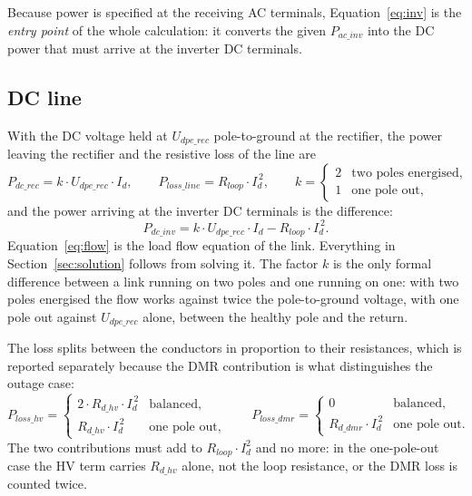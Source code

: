 Because power is specified at the receiving AC terminals,
Equation~\eqref{eq:inv} is the \emph{entry point} of the whole calculation: it
converts the given $P_{ac\_inv}$ into the DC power that must arrive at the
inverter DC terminals.

\subsection{DC line}
With the DC voltage held at $U_{dpe\_rec}$ pole-to-ground at the rectifier, the power
leaving the rectifier and the resistive loss of the line are
\begin{equation}
  P_{dc\_rec} = k\cdot U_{dpe\_rec}\cdot I_{d},
  \qquad
  P_{loss\_line} = R_{loop}\cdot I_{d}^{\,2},
  \qquad
  k =
  \begin{cases}
    2 & \text{two poles energised,}\\
    1 & \text{one pole out,}
  \end{cases}
  \label{eq:dcline}
\end{equation}
and the power arriving at the inverter DC terminals is the difference:
\begin{equation}
  P_{dc\_inv} = k\cdot U_{dpe\_rec}\cdot I_{d} - R_{loop}\cdot I_{d}^{\,2}.
  \label{eq:flow}
\end{equation}
Equation~\eqref{eq:flow} is the load flow equation of the link. Everything in
Section~\ref{sec:solution} follows from solving it. The factor $k$ is the only
formal difference between a link running on two poles and one running on one:
with two poles energised the flow works against twice the pole-to-ground
voltage, with one pole out against $U_{dpe\_rec}$ alone, between the healthy
pole and the return.

The loss splits between the conductors in proportion to their resistances,
which is reported separately because the DMR contribution is what
distinguishes the outage case:
\begin{equation}
  P_{loss\_hv} =
  \begin{cases}
    2\cdot R_{d\_hv}\cdot I_{d}^{\,2} & \text{balanced,}\\
    R_{d\_hv}\cdot I_{d}^{\,2}  & \text{one pole out,}
  \end{cases}
  \qquad
  P_{loss\_dmr} =
  \begin{cases}
    0                    & \text{balanced,}\\
    R_{d\_dmr}\cdot I_{d}^{\,2}  & \text{one pole out.}
  \end{cases}
  \label{eq:losssplit}
\end{equation}
The two contributions must add to $R_{loop}\cdot I_{d}^{2}$ and no more: in the
one-pole-out case the HV term carries $R_{d\_hv}$ alone, not the loop resistance,
or the DMR loss is counted twice.

